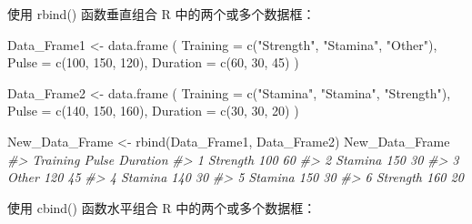 \documentclass[
]{book}
\newenvironment{Shaded}{\begin{snugshade}}{\end{snugshade}}
\newcommand{\AttributeTok}[1]{\textcolor[rgb]{0.77,0.63,0.00}{#1}}
\newcommand{\CommentTok}[1]{\textcolor[rgb]{0.56,0.35,0.01}{\textit{#1}}}
\newcommand{\DecValTok}[1]{\textcolor[rgb]{0.00,0.00,0.81}{#1}}
\newcommand{\FunctionTok}[1]{\textcolor[rgb]{0.00,0.00,0.00}{#1}}
\newcommand{\NormalTok}[1]{#1}
\newcommand{\OtherTok}[1]{\textcolor[rgb]{0.56,0.35,0.01}{#1}}
\newcommand{\StringTok}[1]{\textcolor[rgb]{0.31,0.60,0.02}{#1}}
\begin{document}
使用 rbind() 函数垂直组合 R 中的两个或多个数据框：

\begin{Shaded}
\begin{Highlighting}[]
\NormalTok{Data\_Frame1 }\OtherTok{\textless{}{-}} \FunctionTok{data.frame}\NormalTok{ (}
  \AttributeTok{Training =} \FunctionTok{c}\NormalTok{(}\StringTok{"Strength"}\NormalTok{, }\StringTok{"Stamina"}\NormalTok{, }\StringTok{"Other"}\NormalTok{),}
  \AttributeTok{Pulse =} \FunctionTok{c}\NormalTok{(}\DecValTok{100}\NormalTok{, }\DecValTok{150}\NormalTok{, }\DecValTok{120}\NormalTok{),}
  \AttributeTok{Duration =} \FunctionTok{c}\NormalTok{(}\DecValTok{60}\NormalTok{, }\DecValTok{30}\NormalTok{, }\DecValTok{45}\NormalTok{)}
\NormalTok{)}

\NormalTok{Data\_Frame2 }\OtherTok{\textless{}{-}} \FunctionTok{data.frame}\NormalTok{ (}
  \AttributeTok{Training =} \FunctionTok{c}\NormalTok{(}\StringTok{"Stamina"}\NormalTok{, }\StringTok{"Stamina"}\NormalTok{, }\StringTok{"Strength"}\NormalTok{),}
  \AttributeTok{Pulse =} \FunctionTok{c}\NormalTok{(}\DecValTok{140}\NormalTok{, }\DecValTok{150}\NormalTok{, }\DecValTok{160}\NormalTok{),}
  \AttributeTok{Duration =} \FunctionTok{c}\NormalTok{(}\DecValTok{30}\NormalTok{, }\DecValTok{30}\NormalTok{, }\DecValTok{20}\NormalTok{)}
\NormalTok{)}

\NormalTok{New\_Data\_Frame }\OtherTok{\textless{}{-}} \FunctionTok{rbind}\NormalTok{(Data\_Frame1, Data\_Frame2)}
\NormalTok{New\_Data\_Frame}
\CommentTok{\#\textgreater{}   Training Pulse Duration}
\CommentTok{\#\textgreater{} 1 Strength   100       60}
\CommentTok{\#\textgreater{} 2  Stamina   150       30}
\CommentTok{\#\textgreater{} 3    Other   120       45}
\CommentTok{\#\textgreater{} 4  Stamina   140       30}
\CommentTok{\#\textgreater{} 5  Stamina   150       30}
\CommentTok{\#\textgreater{} 6 Strength   160       20}
\end{Highlighting}
\end{Shaded}

使用 cbind() 函数水平组合 R 中的两个或多个数据框：
\end{document}
